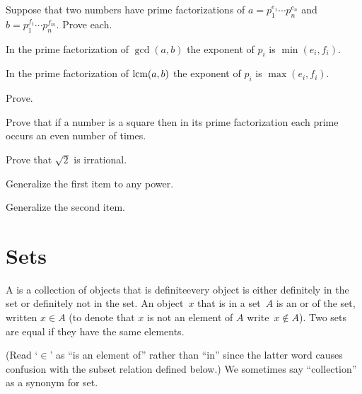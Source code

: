 \documentclass{ibl}
\begin{document}

\begin{ex}
Suppose that two numbers have prime factorizations 
of $a=p_1^{e_1}\cdots p_n^{e_n}$
and $b=p_1^{f_1}\cdots p_n^{f_m}$.
Prove each.
\begin{exes}
\item
  In the prime factorization of
  $\gcd(a,b)$ the exponent of $p_i$ is $\min(e_i,f_i)$.
\item In the prime factorization of $\operatorname{lcm}(a,b)$ the exponent of 
  $p_i$ is $\max(e_i,f_i)$.
\end{exes}
\end{ex}

\begin{ex} Prove.
\begin{exes}
\item Prove that if a number is a square then in its prime factorization 
  each prime occurs an even number of times.
\item Prove that $\sqrt{2}$ is irrational.
\item Generalize the first item to any power.
\item Generalize the second item.    
\end{exes}
\end{ex}








\chapter{Sets}
\begin{df}
A  is a collection of objects that is definite\Dash every 
object is either
definitely in the set or definitely not in the set.
An object~$x$ that is in a set~$A$ is an 
or 
of the set, written $x\in A$
(to denote that $x$ is not an element of $A$ write~$x\notin A$).
Two sets are equal if they have the same elements.
\end{df}
\noindent (Read `$\in$' as ``is an element of'' rather than ``in'' since the 
latter word causes confusion with 
the subset relation defined below.)
We sometimes say ``collection'' as a synonym for set.
\end{document}
